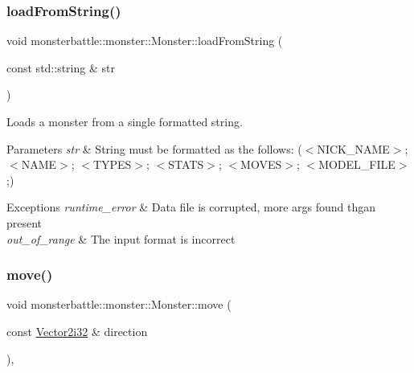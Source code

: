 \subsubsection{\texorpdfstring{load\+From\+String()}{loadFromString()}}
{\footnotesize\ttfamily void monsterbattle\+::monster\+::\+Monster\+::load\+From\+String (\begin{DoxyParamCaption}\item[{const std\+::string \&}]{str }\end{DoxyParamCaption})}



Loads a monster from a single formatted string. 


\begin{DoxyParams}{Parameters}
{\em str} & String must be formatted as the follows\+: ($<$\+N\+I\+C\+K\+\_\+\+N\+A\+M\+E$>$; $<$\+N\+A\+M\+E$>$; $<$\+T\+Y\+P\+E\+S$>$; $<$\+S\+T\+A\+T\+S$>$; $<$\+M\+O\+V\+E\+S$>$; $<$\+M\+O\+D\+E\+L\+\_\+\+F\+I\+L\+E$>$;)\\
\hline
\end{DoxyParams}

\begin{DoxyExceptions}{Exceptions}
{\em runtime\+\_\+error} & Data file is corrupted, more args found thgan present \\
\hline
{\em out\+\_\+of\+\_\+range} & The input format is incorrect \\
\hline
\end{DoxyExceptions}
\mbox{\label{classmonsterbattle_1_1monster_1_1Monster_a3ba3e637c132c737dd5c19de3932dc18}} 
\subsubsection{\texorpdfstring{move()}{move()}}
{\footnotesize\ttfamily void monsterbattle\+::monster\+::\+Monster\+::move (\begin{DoxyParamCaption}\item[{const \hyperlink{structmonsterbattle_1_1Vector}{Vector2i32} \&}]{direction }\end{DoxyParamCaption})\hspace{0.3cm}{\ttfamily [override]}, {\ttfamily [virtual]}}



